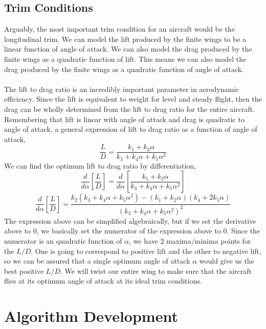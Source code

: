 \subsection{Trim Conditions}
\begin{comment}
\end{comment}
Arguably, the most important trim condition for an aircraft would be the longitudinal trim. 
We can model the lift produced by the finite wings to be a linear function of angle of attack.
We can also model the drag produced by the finite wings as a quadratic function of lift.
This means we can also model the drag produced by the finite wings as a quadratic function of angle of attack.
\\~\\The lift to drag ratio is an incredibly important parameter in aerodynamic efficiency. 
Since the lift is equivalent to weight for level and steady flight, then the drag can be wholly determined from the lift to drag ratio for the entire aircraft.
Remembering that lift is linear with angle of attack and drag is quadratic to angle of attack, a general expression of lift to drag ratio as a function of angle of attack,
$$\frac{L}{D} = \frac{k_{1} + k_{2}\alpha}{k_{3} + k_{4}\alpha + k_{5}\alpha^{2}}$$
We can find the optimum lift to drag ratio by differentiation,
$$\frac{d}{d \alpha}\left[\frac{L}{D}\right] = \frac{d}{d \alpha}\left[\frac{k_{1} + k_{2}\alpha}{k_{3} + k_{4}\alpha + k_{5}\alpha^{2}}\right]$$
$$\frac{d}{d \alpha}\left[\frac{L}{D}\right] = \frac{k_{2}(k_{3} + k_{4}\alpha + k_{5}\alpha^{2})-(k_{1} + k_{2}\alpha)(k_{4} + 2k_{5}\alpha)}{(k_{3} + k_{4}\alpha + k_{5}\alpha^{2})^{2}}$$
The expression above can be simplified algebraically, but if we set the derivative above to $0$, we basically set the numerator of the expression above to $0$. 
Since the numerator is an quadratic function of $\alpha$, we have $2$ maxima/minima points for the $L/D$. 
One is going to correspond to positive lift and the other to negative lift, so we can be assured that a single optimum angle of attack $\alpha$ would give us the best positive $L/D$.
We will twist our entire wing to make sure that the aircraft flies at its optimum angle of attack at its ideal trim conditions.

\section{Algorithm Development}
\begin{comment}
\end{comment}

